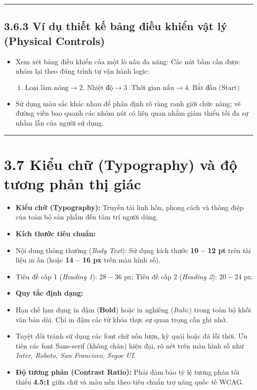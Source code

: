 \documentclass[11pt,a4paper,oneside]{report}
\begin{document}
\bigskip\hrule\bigskip

\subsection{3.6.3 Ví dụ thiết kế bảng điều khiển vật lý (Physical Controls)}
\begin{itemize}[leftmargin=1.5em]
\item Xem xét bảng điều khiển của một lò nấu đa năng: Các nút bấm cần được nhóm lại theo đúng trình tự vận hành logic:
\end{itemize}
\[ \text{1. Loại làm nóng} \longrightarrow \text{2. Nhiệt độ} \longrightarrow \text{3. Thời gian nấu} \longrightarrow \text{4. Bắt đầu (Start)} \]
\begin{itemize}[leftmargin=1.5em]
\item Sử dụng màu sắc khác nhau để phân định rõ ràng ranh giới chức năng; vẽ đường viền bao quanh các nhóm nút có liên quan nhằm giảm thiểu tối đa sự nhầm lẫn của người sử dụng.
\end{itemize}

\bigskip\hrule\bigskip

\section{3.7 Kiểu chữ (Typography) và độ tương phản thị giác}

\begin{itemize}[leftmargin=1.5em]
\item \textbf{Kiểu chữ (Typography):} Truyền tải linh hồn, phong cách và thông điệp của toàn bộ sản phẩm đến tâm trí người dùng.
\item \textbf{Kích thước tiêu chuẩn:}
\item Nội dung thông thường (\textit{Body Text}): Sử dụng kích thước \textbf{10 – 12 pt} trên tài liệu in ấn (hoặc \textbf{14 – 16 px} trên màn hình số).
\item Tiêu đề cấp 1 (\textit{Heading 1}): $28 - 36$ px; Tiêu đề cấp 2 (\textit{Heading 2}): $20 - 24$ px.
\item \textbf{Quy tắc định dạng:}
\item Hạn chế lạm dụng in đậm (\textbf{Bold}) hoặc in nghiêng (\textit{Italic}) trong toàn bộ khối văn bản dài. Chỉ in đậm các từ khóa thực sự quan trọng cần ghi nhớ.
\item Tuyệt đối tránh sử dụng các font chữ uốn lượn, kỳ quái hoặc đã lỗi thời. Ưu tiên các font Sans-serif (không chân) hiện đại, rõ nét trên màn hình số như \textit{Inter, Roboto, San Francisco, Segoe UI}.
\item \textbf{Độ tương phản (Contrast Ratio):} Phải đảm bảo tỷ lệ tương phản tối thiểu \textbf{4.5:1} giữa chữ và màu nền theo tiêu chuẩn trợ năng quốc tế WCAG.
\end{itemize}
\end{document}
